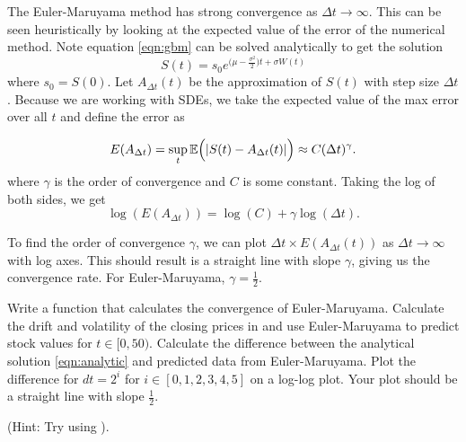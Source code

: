 The Euler-Maruyama method has strong convergence as $\Delta t\rightarrow\infty$.
This can be seen heuristically by looking at the expected value of the error of the numerical method.
Note equation \ref{eqn:gbm} can be solved analytically to get the solution
\begin{equation}
S(t)=s_0e^{\bigl(\mu-\frac{\sigma^2}{2}\bigr)t+\sigma W(t)}
\label{eqn:analytic}
\end{equation}
where $s_0=S(0)$.
Let $A_{\Delta t}(t)$ be the approximation of $S(t)$ with step size $\Delta t$.
Because we are working with SDEs, we take the expected value of the max error over all $t$ and define the error as

\begin{equation}
E(A_{\Delta t})=\sup_t\mathbb{E}\Bigl(|S(t)-A_{\Delta t}(t)|\Bigr)\approx C(\Delta t)^\gamma.
\end{equation}
where $\gamma$ is the order of convergence and $C$ is some constant.
Taking the log of both sides, we get
\begin{equation}
\log(E(A_{\Delta t}))=\log(C)+\gamma\log(\Delta t).
\end{equation}

To find the order of convergence $\gamma$, we can plot $\Delta t\times E(A_{\Delta t}(t))$ as $\Delta t\rightarrow\infty$ with log axes.
This should result is a straight line with slope $\gamma$, giving us the convergence rate.
For Euler-Maruyama, $\gamma=\frac{1}{2}$.

\begin{problem}
Write a function  that calculates the convergence of Euler-Maruyama.
Calculate the drift and volatility of the closing prices in  and use Euler-Maruyama to predict stock values for $t\in[0,50)$.
Calculate the difference between the analytical solution \ref{eqn:analytic} and predicted data from Euler-Maruyama.
Plot the difference for $dt=2^i$ for $i\in[0,1,2,3,4,5]$ on a log-log plot.
Your plot should be a straight line with slope $\frac{1}{2}$.

(Hint: Try using ).
\end{problem}



